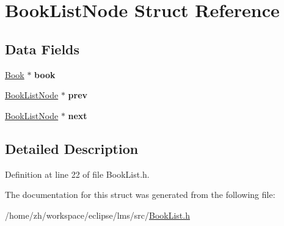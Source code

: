 \hypertarget{structBookListNode}{\section{Book\-List\-Node Struct Reference}
\label{structBookListNode}
}
\subsection*{Data Fields}
\begin{DoxyCompactItemize}
\item 
\hypertarget{structBookListNode_a5e41211d73d778767175b37fcd1e8c71}{\hyperlink{structBook}{Book} $\ast$ {\bfseries book}}\label{structBookListNode_a5e41211d73d778767175b37fcd1e8c71}

\item 
\hypertarget{structBookListNode_af2cb8bf050fd9f9639b8949f2db578e2}{\hyperlink{structBookListNode}{Book\-List\-Node} $\ast$ {\bfseries prev}}\label{structBookListNode_af2cb8bf050fd9f9639b8949f2db578e2}

\item 
\hypertarget{structBookListNode_a3f892f06ca83fe53b9748925dfa01d57}{\hyperlink{structBookListNode}{Book\-List\-Node} $\ast$ {\bfseries next}}\label{structBookListNode_a3f892f06ca83fe53b9748925dfa01d57}

\end{DoxyCompactItemize}


\subsection{Detailed Description}


Definition at line 22 of file Book\-List.\-h.



The documentation for this struct was generated from the following file\-:\begin{DoxyCompactItemize}
\item 
/home/zh/workspace/eclipse/lms/src/\hyperlink{BookList_8h}{Book\-List.\-h}\end{DoxyCompactItemize}
